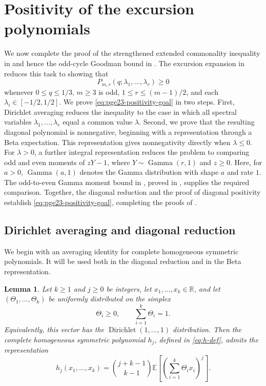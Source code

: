 \documentclass[11pt]{article}
\newtheorem{lemma}[theorem]{Lemma}
\theoremstyle{remark}
\numberwithin{equation}{section}
\newcommand{\R}{\mathbb R}
\newcommand{\E}{\mathbb E}
\newcommand{\GammaLaw}{\operatorname{Gamma}}
\begin{document}
\section{Positivity of the excursion polynomials}
\label{sec:excursion-positivity}

We now complete the proof of the strengthened extended commonality inequality
in  and hence the odd-cycle Goodman bound in
.
The excursion expansion in  reduces this task to showing that
\begin{equation}\label{eq:pge23-positivity-goal}
  P_{m,r}(q;\lambda_1,\ldots,\lambda_r)\ge0
\end{equation}
whenever $0\le q\le1/3$, $m\ge3$ is odd, $1\le r\le(m-1)/2$, and each
$\lambda_i\in[-1/2,1/2]$.
We prove \eqref{eq:pge23-positivity-goal} in two steps.
First, Dirichlet averaging reduces the inequality to the case in which all
spectral variables $\lambda_1,\ldots,\lambda_r$ equal a common value $\lambda$.
Second, we prove that the resulting diagonal polynomial is nonnegative,
beginning with a representation through a Beta expectation.
This representation gives nonnegativity directly when $\lambda\le0$.
For $\lambda>0$, a further integral representation reduces the problem to
comparing odd and even moments of $zY-1$, where $Y\sim\GammaLaw(r,1)$
and $z\ge0$.
Here, for $a>0$, $\GammaLaw(a,1)$ denotes the Gamma distribution with shape $a$ and rate $1$.
The odd-to-even Gamma moment bound in ,
proved in , supplies the required comparison.
Together, the diagonal reduction and the proof of diagonal positivity establish
\eqref{eq:pge23-positivity-goal}, completing the proofs of
.

\subsection{Dirichlet averaging and diagonal reduction}
\label{subsec:dirichlet-reduction}

We begin with an averaging identity for complete homogeneous symmetric
polynomials. It will be used both in the diagonal reduction and in the
Beta representation.

\begin{lemma}\label{lem:pge23-dirichlet-moment}
  Let $k\ge1$ and $j\ge0$ be integers, let $x_1,\ldots,x_k\in\R$, and
  let $(\Theta_1,\ldots,\Theta_k)$ be uniformly distributed on the simplex
  \[
    \Theta_i\ge0,\qquad \sum_{i=1}^k\Theta_i=1.
  \]
  Equivalently, this vector has the $\operatorname{Dirichlet}(1,\ldots,1)$
  distribution.
  Then the complete homogeneous symmetric polynomial $h_j$, defined in
  \eqref{eq:h-def}, admits the representation
  \begin{equation}\label{eq:pge23-dirichlet-moment}
    h_j(x_1,\ldots,x_k)
    =\binom{j+k-1}{k-1}
    \E\left[\left(\sum_{i=1}^k\Theta_i x_i\right)^j\right].
  \end{equation}
\end{lemma}
\end{document}
